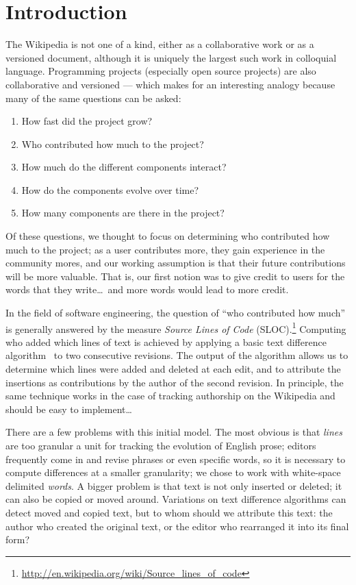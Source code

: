 
\section{Introduction}
\label{sec:diff-intro}

The Wikipedia is not one of a kind, either as a collaborative work or as
a versioned document, although it is uniquely the largest such work
in colloquial language.
Programming projects (especially open source projects)
are also collaborative and versioned --- which makes for
an interesting analogy because many of the same questions can be asked:
\begin{enumerate}
\item How fast did the project grow?
\item Who contributed how much to the project?
\item How much do the different components interact?
\item How do the components evolve over time?
\item How many components are there in the project?
\end{enumerate}
Of these questions, we thought to focus on determining who contributed
how much to the project; as a user contributes more, they gain experience
in the community mores, and our working assumption is that their future
contributions will be more valuable.
That is, our first notion was to give credit to users for the words that
they write\ldots\ and more words would lead to more credit.

In the field of software engineering, the question of ``who contributed
how much'' is generally answered by the measure
\textit{Source Lines of Code} (SLOC).\footnote{\url{http://en.wikipedia.org/wiki/Source_lines_of_code}}
Computing who added which lines of text is achieved
by applying a basic text difference
algorithm~\cite{Myers1986,Tichy1984,Burns1997} to two consecutive
revisions.
The output of the algorithm allows us to determine which lines were added and
deleted at each edit, and to attribute the insertions as contributions by the
author of the second revision.
In principle, the same technique works in the case of tracking authorship
on the Wikipedia and should be easy to implement\ldots

There are a few problems with this initial model.
The most obvious is that \textit{lines} are too granular
a unit for tracking the evolution of English prose;
editors frequently come in and revise phrases or
even specific words, so it is necessary to compute
differences at a smaller granularity;
we chose to work with white-space delimited \textit{words}.
A bigger problem is that text is not only inserted
or deleted; it can also be copied or moved around.
Variations on text difference algorithms can
detect moved and copied text, but to whom should we attribute this text:
the author who created the original text, or the editor who rearranged it
into its final form?

